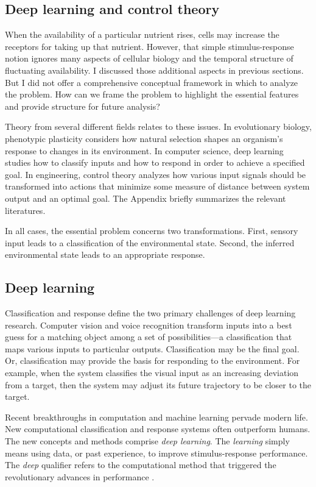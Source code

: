 \documentclass[\mydocfontsize]{article}
\begin{document}
\begin{multicols}{2}
\section{Deep learning and control theory}

When the availability of a particular nutrient rises, cells may increase the receptors for taking up that nutrient. However, that simple stimulus-response notion ignores many aspects of cellular biology and the temporal structure of fluctuating availability. I discussed those additional aspects in previous sections. But I did not offer a comprehensive conceptual framework in which to analyze the problem. How can we frame the problem to highlight the essential features and provide structure for future analysis?

Theory from several different fields relates to these issues. In evolutionary biology, phenotypic plasticity considers how natural selection shapes an organism's response to changes in its environment. In computer science, deep learning studies how to classify inputs and how to respond in order to achieve a specified goal. In engineering, control theory analyzes how various input signals should be transformed into actions that minimize some measure of distance between system output and an optimal goal. The Appendix briefly summarizes the relevant literatures.

In all cases, the essential problem concerns two transformations. First, sensory input leads to a classification of the environmental state. Second, the inferred environmental state leads to an appropriate response. 

\subsection{Deep learning}

Classification and response define the two primary challenges of deep learning research. Computer vision and voice recognition transform inputs into a best guess for a matching object among a set of possibilities---a classification that maps various inputs to particular outputs. Classification may be the final goal. Or, classification may provide the basis for responding to the environment. For example, when the system classifies the visual input as an increasing deviation from a target, then the system may adjust its future trajectory to be closer to the target.

Recent breakthroughs in computation and machine learning pervade modern life. New computational classification and response systems often outperform humans. The new concepts and methods comprise \textit{deep learning}. The \textit{learning} simply means using data, or past experience, to improve stimulus-response performance. The \textit{deep} qualifier refers to the computational method that triggered the revolutionary advances in performance \autocite{nielsen15neural,goodfellow16deep}. 


\end{multicols}
\end{document}
